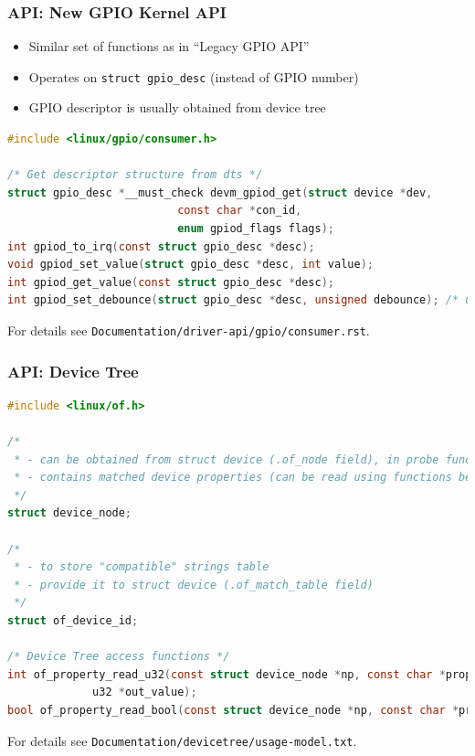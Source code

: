 \documentclass[aspectratio=169,usenames,dvipsnames]{beamer}
\newcounter{cont}
\begin{document}
\begin{frame}[containsverbatim]
  \frametitle{API: New GPIO Kernel API}

  \begin{itemize}
  \item Similar set of functions as in ``Legacy GPIO API''
  \item Operates on \texttt{struct gpio\_desc} (instead of GPIO number)
  \item GPIO descriptor is usually obtained from device tree
  \end{itemize}

  \begin{lstlisting}[language=c,numbers=none]
#include <linux/gpio/consumer.h>

/* Get descriptor structure from dts */
struct gpio_desc *__must_check devm_gpiod_get(struct device *dev,
					      const char *con_id,
					      enum gpiod_flags flags);
int gpiod_to_irq(const struct gpio_desc *desc);
void gpiod_set_value(struct gpio_desc *desc, int value);
int gpiod_get_value(const struct gpio_desc *desc);
int gpiod_set_debounce(struct gpio_desc *desc, unsigned debounce); /* usec */
  \end{lstlisting}

  For details see \texttt{Documentation/driver-api/gpio/consumer.rst}.
\end{frame}

\begin{frame}[containsverbatim]
  \frametitle{API: Device Tree}
  \begin{lstlisting}[language=c,numbers=none]
#include <linux/of.h>

/*
 * - can be obtained from struct device (.of_node field), in probe function
 * - contains matched device properties (can be read using functions below)
 */
struct device_node;

/*
 * - to store "compatible" strings table
 * - provide it to struct device (.of_match_table field)
 */
struct of_device_id;

/* Device Tree access functions */
int of_property_read_u32(const struct device_node *np, const char *propname,
			 u32 *out_value);
bool of_property_read_bool(const struct device_node *np, const char *propname);
  \end{lstlisting}

  For details see \texttt{Documentation/devicetree/usage-model.txt}.
  \vspace*{-5mm}
\end{frame}
\end{document}
